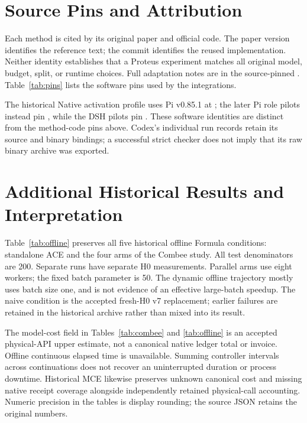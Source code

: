 \section{Source Pins and Attribution}
\label{app:pins}

Each method is cited by its original paper and official code. The paper version identifies the reference text; the commit identifies the reused implementation. Neither identity establishes that a Proteus experiment matches all original model, budget, split, or runtime choices. Full adaptation notes are in the source-pinned . Table~\ref{tab:pins} lists the software pins used by the integrations.



The historical Native activation profile uses Pi v0.85.1 at ; the later Pi role pilots instead pin , while the DSH pilots pin . These software identities are distinct from the method-code pins above. Codex's individual run records retain its source and binary bindings; a successful strict checker does not imply that its raw binary archive was exported.

\section{Additional Historical Results and Interpretation}
\label{app:fullresults}

Table~\ref{tab:offline} preserves all five historical offline Formula conditions: standalone ACE and the four arms of the Combee study. All test denominators are 200. Separate runs have separate H0 measurements. Parallel arms use eight workers; the fixed batch parameter is 50. The dynamic offline trajectory mostly uses batch size one, and is not evidence of an effective large-batch speedup. The naive condition is the accepted fresh-H0 v7 replacement; earlier failures are retained in the historical archive rather than mixed into its result.



The model-cost field in Tables~\ref{tab:combee} and \ref{tab:offline} is an accepted physical-API upper estimate, not a canonical native ledger total or invoice. Offline continuous elapsed time is unavailable. Summing controller intervals across continuations does not recover an uninterrupted duration or process downtime. Historical MCE likewise preserves unknown canonical cost and missing native receipt coverage alongside independently retained physical-call accounting. Numeric precision in the tables is display rounding; the source JSON retains the original numbers.

